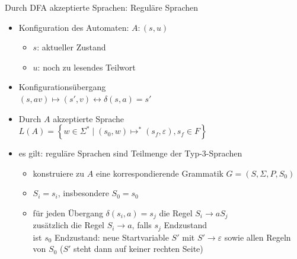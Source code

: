 \begin{frame}{Durch DFA akzeptierte Sprachen: Reguläre Sprachen}
	\begin{itemize}
		\item Konfiguration des Automaten: $A: (s,u)$
		\begin{itemize}
			\item $s$: aktueller Zustand
			\item $u$: noch zu lesendes Teilwort
		\end{itemize}
		\item Konfigurationsübergang\\
		\quad $(s, av) \mapsto (s', v) \leftrightarrow \delta(s,a) = s'$
		\item Durch $A$ akzeptierte Sprache\\
		\quad $L(A) = \left\{w \in \Sigma^* \mid (s_0,w) \mapsto^* (s_f, \varepsilon), s_f \in F \right\}$
		\item es gilt: reguläre Sprachen sind Teilmenge der Typ-3-Sprachen\\
		\begin{itemize}
			\item[Beweis:] konstruiere zu $A$ eine korrespondierende Grammatik $G=(S,\Sigma,P,S_0)$\\
			\item[$S:$] $S_i=s_i$, insbesondere $S_0=s_0$
			\item[$P:$] für jeden Übergang $\delta(s_i,a)=s_j$ die Regel $S_i \rightarrow aS_j$\\
			zusätzlich die Regel $S_i \rightarrow a$, falls $s_j$ Endzustand\\
			ist $s_0$ Endzustand: neue Startvariable $S'$ mit $S' \rightarrow \varepsilon$ sowie allen Regeln von $S_0$ ($S'$ steht dann auf keiner rechten Seite)
		\end{itemize}
	\end{itemize}
\end{frame}


